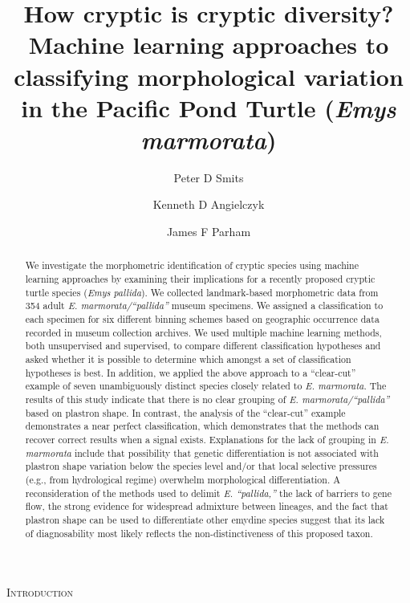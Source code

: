 \documentclass[12pt,letterpaper]{article}
\title{How cryptic is cryptic diversity? Machine learning approaches to classifying morphological variation in the Pacific Pond Turtle (\textit{Emys marmorata})}
\author[1]{Peter D Smits}%
\author[1,2]{Kenneth D Angielczyk}%
\author[3]{James F Parham}%
\affil[1]{Committee on Evolutionary Biology, University of Chicago}
\affil[2]{Integrative Research Center, Field Museum of Natural History}
\affil[3]{Department of Geological Sciences, California State University -- Fullerton}
\renewcommand{\section}[1]{%
\bigskip
\begin{center}
\begin{Large}
\normalfont\scshape #1
\medskip
\end{Large}
\end{center}}
\begin{document}
\maketitle
{}

\linenumbers
\modulolinenumbers[2]

\begin{abstract}
  We investigate the morphometric identification of cryptic species using machine learning approaches by examining their implications for a recently proposed cryptic turtle species (\textit{Emys pallida}). We collected landmark-based morphometric data from 354 adult \textit{E. marmorata/``pallida''} museum specimens. We assigned a classification to each specimen for six different binning schemes based on geographic occurrence data recorded in museum collection archives. We used multiple machine learning methods, both unsupervised and supervised, to compare different classification hypotheses and asked whether it is possible to determine which amongst a set of classification hypotheses is best. In addition, we applied the above approach to a “clear-cut” example of seven unambiguously distinct species closely related to \textit{E. marmorata}. The results of this study indicate that there is no clear grouping of \textit{E. marmorata/``pallida''} based on plastron shape. In contrast, the analysis of the ``clear-cut'' example demonstrates a near perfect classification, which demonstrates that the methods can recover correct results when a signal exists. Explanations for the lack of grouping in \textit{E. marmorata} include that possibility that genetic differentiation is not associated with plastron shape variation below the species level and/or that local selective pressures (e.g., from hydrological regime) overwhelm morphological differentiation. A reconsideration of the methods used to delimit \textit{E. ``pallida,''} the lack of barriers to gene flow, the strong evidence for widespread admixture between lineages, and the fact that plastron shape can be used to differentiate other emydine species suggest that its lack of diagnosability most likely reflects the non-distinctiveness of this proposed taxon.
\end{abstract}

\section{Introduction}
\end{document}
